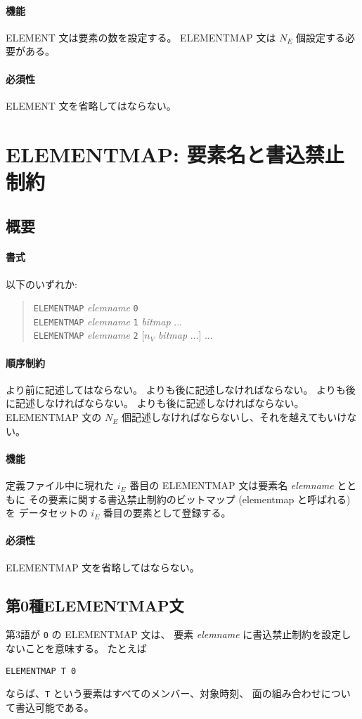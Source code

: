 \paragraph{機能}
ELEMENT 文は要素の数を設定する。
ELEMENTMAP 文は $N_E$ 個設定する必要がある。
\paragraph{必須性}
ELEMENT 文を省略してはならない。

\section{ELEMENTMAP: 要素名と書込禁止制約}
\subsection{概要}
\label{sec:def:ELEMENTMAP}
\paragraph{書式}
以下のいずれか:
\begin{quote}
{\tt ELEMENTMAP} {\it elemname} {\tt 0} \\
{\tt ELEMENTMAP} {\it elemname} {\tt 1} {\it bitmap} ... \\
{\tt ELEMENTMAP} {\it elemname} {\tt 2} [$n_V$ {\it bitmap} ...] ...
\end{quote}
\paragraph{順序制約}
 より前に記述してはならない。
 よりも後に記述しなければならない。
 よりも後に記述しなければならない。
 よりも後に記述しなければならない。
ELEMENTMAP 文の $N_E$ 個記述しなければならないし、それを越えてもいけない。
\paragraph{機能}
定義ファイル中に現れた $i_E$ 番目の
ELEMENTMAP 文は要素名 {\it elemname} とともに
その要素に関する書込禁止制約のビットマップ (elementmap と呼ばれる) を
データセットの $i_E$ 番目の要素として登録する。
\paragraph{必須性}
ELEMENTMAP 文を省略してはならない。

\subsection{第0種ELEMENTMAP文}
第3語が {\tt 0} の ELEMENTMAP 文は、
要素 {\it elemname} に書込禁止制約を設定しないことを意味する。
たとえば 
\begin{screen}
{\tt ELEMENTMAP T  0}
\end{screen}
ならば、{\tt T} という要素はすべてのメンバー、対象時刻、
面の組み合わせについて書込可能である。

